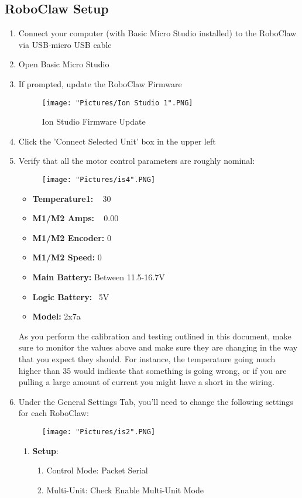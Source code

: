 \documentclass[12pt]{article}
\begin{document}
\subsection{RoboClaw Setup}
\begin{enumerate}
	\item Connect your computer (with Basic Micro Studio installed) to the RoboClaw via USB-micro USB cable
	\item Open Basic Micro Studio
	\item If prompted, update the RoboClaw Firmware
	\begin{figure}[H]
 		\centering
		\texttt{[image: "Pictures/Ion Studio 1".PNG]}
 		\caption{Ion Studio Firmware Update}
	\end{figure}
	
	\item Click the 'Connect Selected Unit' box in the upper left
	\item Verify that all the motor control parameters are roughly nominal:
	\begin{figure}[H]
 		\centering
		\texttt{[image: "Pictures/is4".PNG]}
 		\caption{}
	\end{figure}
	\begin{itemize}
		\item \textbf{Temperature1:} ~ 30
		\item \textbf{M1/M2 Amps:} ~ 0.00
		\item \textbf{M1/M2 Encoder:} 0
		\item \textbf{M1/M2 Speed:} 0
		\item \textbf{Main Battery:} Between 11.5-16.7V
		\item \textbf{Logic Battery:} ~5V
		\item \textbf{Model:} 2x7a
	\end{itemize}
	\noindent As you perform the calibration and testing outlined in this document, make sure to monitor the values above and make sure they are changing in the way that you expect they should. For instance, the temperature going much higher than 35 would indicate that something is going wrong, or if you are pulling a large amount of current you might have a short in the wiring. 
	\item Under the General Settings Tab, you'll need to change the following settings for each RoboClaw:
	\begin{figure}[H]
 		\centering
		\texttt{[image: "Pictures/is2".PNG]}
 		\caption{}
	\end{figure}
	\begin{enumerate}
		\item \textbf{Setup}:
		\begin{enumerate}
			\item Control Mode: Packet Serial
			\item Multi-Unit: Check Enable Multi-Unit Mode
		\end{enumerate}


\end{enumerate}
\end{enumerate}
\end{document}
